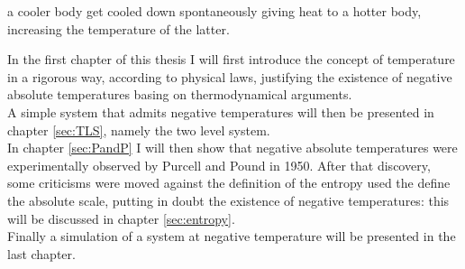 a cooler body get cooled down spontaneously giving heat to a hotter body, increasing the temperature of the latter. \par
\vspace{10pt}
In the first chapter of this thesis I will first introduce the concept of temperature in a rigorous way, according to physical laws, justifying the existence of negative absolute temperatures basing on thermodynamical arguments. \\
A simple system that admits negative temperatures will then be presented in chapter \ref{sec:TLS}, namely the two level system. \\
In chapter \ref{sec:PandP} I will then show that negative absolute temperatures were experimentally observed by Purcell and Pound in 1950. 
After that discovery, some criticisms were moved against the definition of the entropy used the define the absolute scale, putting in doubt the existence of negative temperatures: this will be discussed in chapter \ref{sec:entropy}. \\
Finally a simulation of a system at negative temperature will be presented in the last chapter.